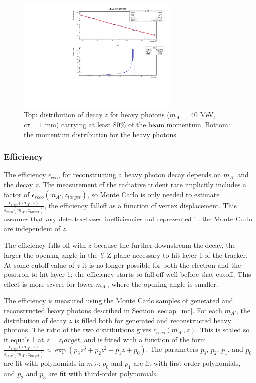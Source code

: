 \begin{figure}[ht]
\begin{center}
    \includegraphics[width=0.7\textwidth,page=1,angle=-90]{vertexing/figs/acceptance_40}
\end{center}
    \caption{Top: distribution of decay $z$ for heavy photons ($m_{A'}=40$ MeV, $c\tau=1$ mm) carrying at least 80\% of the beam momentum. Bottom: the momentum distribution for the heavy photons.}
    \label{fig:decay_z_truth}
\end{figure}

\subsubsection{Efficiency}

The efficiency $\epsilon_{reco}$ for reconstructing a heavy photon decay depends on $m_{A'}$ and the decay $z$.
The measurement of the radiative trident rate implicitly includes a factor of $\epsilon_{reco}(m_{A'},z_{target})$, so Monte Carlo is only needed to estimate $\frac{\epsilon_{reco}(m_{A'},z)}{\epsilon_{reco}(m_{A'},z_{target})}$, the efficiency falloff as a function of vertex displacement.
This assumes that any detector-based inefficiencies not represented in the Monte Carlo are independent of $z$.

The efficiency falls off with $z$ because the further downstream the decay, the larger the opening angle in the Y-Z plane necessary to hit layer 1 of the tracker.
At some cutoff value of $z$ it is no longer possible for both the electron and the positron to hit layer 1; the efficiency starts to fall off well before that cutoff.
This effect is more severe for lower $m_{A'}$, where the opening angle is smaller.

The efficiency is measured using the Monte Carlo samples of generated and reconstructed heavy photons described in Section \ref{sec:ap_mc}.
For each $m_{A'}$, the distribution of decay $z$ is filled both for generated and reconstructed heavy photons.
The ratio of the two distributions gives $\epsilon_{reco}(m_{A'},z)$.
This is scaled so it equals 1 at $z=z_target$, and is fitted with a function of the form $\frac{\epsilon_{reco}(m_{A'},z)}{\epsilon_{reco}(m_{A'},z_{target})} \approx \exp(p_3 z^3 + p_2 z^2 + p_1 z + p_0)$.
The parameters $p_3$, $p_2$, $p_1$, and $p_0$ are fit with polynomials in $m_{A'}$: $p_0$ and $p_1$ are fit with first-order polynomials, and $p_2$ and $p_3$ are fit with third-order polynomials.


